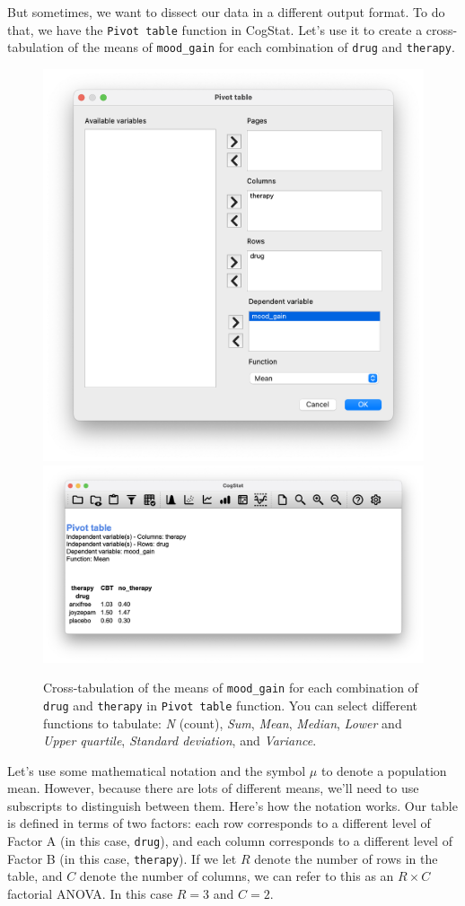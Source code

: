 \documentclass[
]{book}
\theoremstyle{definition}
\theoremstyle{definition}
\theoremstyle{definition}
\theoremstyle{definition}
\theoremstyle{remark}
\begin{document}
But sometimes, we want to dissect our data in a different output format. To do that, we have the \texttt{Pivot\ table} function in CogStat. Let's use it to create a cross-tabulation of the means of \texttt{mood\_gain} for each combination of \texttt{drug} and \texttt{therapy}.



\begin{figure}

{\centering \includegraphics[width=0.66\linewidth]{resources/image/cogstatpivotclinicaldialog} \includegraphics[width=0.66\linewidth]{resources/image/cogstatpivotclinicalpivot} 

}

\caption{Cross-tabulation of the means of \texttt{mood\_gain} for each combination of \texttt{drug} and \texttt{therapy} in \texttt{Pivot\ table} function. You can select different functions to tabulate: \emph{N} (count), \emph{Sum}, \emph{Mean}, \emph{Median}, \emph{Lower} and \emph{Upper quartile}, \emph{Standard deviation}, and \emph{Variance}.}\label{fig:anova2clinicalpivot}
\end{figure}

Let's use some mathematical notation and the symbol \(\mu\) to denote a population mean. However, because there are lots of different means, we'll need to use subscripts to distinguish between them. Here's how the notation works. Our table is defined in terms of two factors: each row corresponds to a different level of Factor A (in this case, \texttt{drug}), and each column corresponds to a different level of Factor B (in this case, \texttt{therapy}). If we let \(R\) denote the number of rows in the table, and \(C\) denote the number of columns, we can refer to this as an \(R \times C\) factorial ANOVA. In this case \(R=3\) and \(C=2\).
\end{document}
